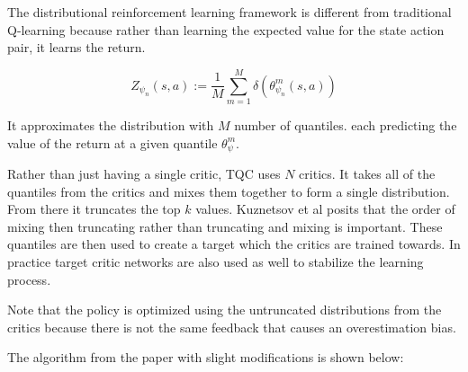 The distributional reinforcement learning framework \cite{bellemareDistributionalPerspectiveReinforcement2017} is different from traditional Q-learning because rather than learning the expected value for the state action pair, it learns the return.

$$Z_{\psi_n}(s, a) := \frac{1}{M} \sum_{m=1}^{M} \delta \left(\theta_{\psi_n}^m(s, a) \right)$$

It approximates the distribution with $M$ number of quantiles. each predicting the value of the return at a given quantile $\theta_{\psi}^{m}$. 

Rather than just having a single critic, TQC uses $N$ critics. It takes all of the quantiles from the critics and mixes them together to form a single distribution. From there it truncates the top $k$ values. Kuznetsov et al \cite{kuznetsovControllingOverestimationBias2020} posits that the order of mixing then truncating rather than truncating and mixing is important. These quantiles are then used to create a target which the critics are trained towards. In practice target critic networks are also used as well to stabilize the learning process.

Note that the policy is optimized using the untruncated distributions from the critics because there is not the same feedback that causes an overestimation bias.

The algorithm from the paper \cite{kuznetsovControllingOverestimationBias2020} with slight modifications is shown below:

